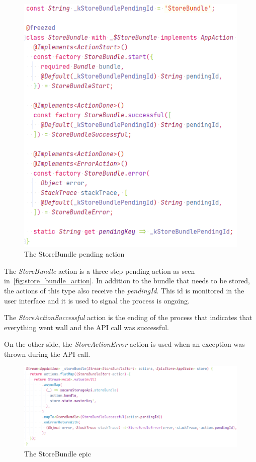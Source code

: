 \documentclass[a4paper,12pt]{report}
\begin{document}
\begin{figure}[H]
    \centering
    \includegraphics[scale=0.6]{images/code/store_bundle_pending_action.png}
    \caption{The StoreBundle pending action}\label{fig:store_bundle_action}
\end{figure}

The \textit{StoreBundle} action is a three step pending action as seen
in~\autoref{fig:store_bundle_action}. In addition to the bundle that needs to
be stored, the actions of this type also receive the \textit{pendingId}. This
id is monitored in the user interface and it is used to signal the process is
ongoing.

The \textit{StoreActionSuccessful} action is the ending of the process that
indicates that everything went wall and the API call was successful.

On the other side, the \textit{StoreActionError} action is used when an
exception was thrown during the API call.

\begin{figure}[H]
    \centering
    \includegraphics[scale=0.6]{images/code/store_bundle_epic.png}
    \caption{The StoreBundle epic}\label{fig:store_bundle_epic}
\end{figure}
\end{document}
